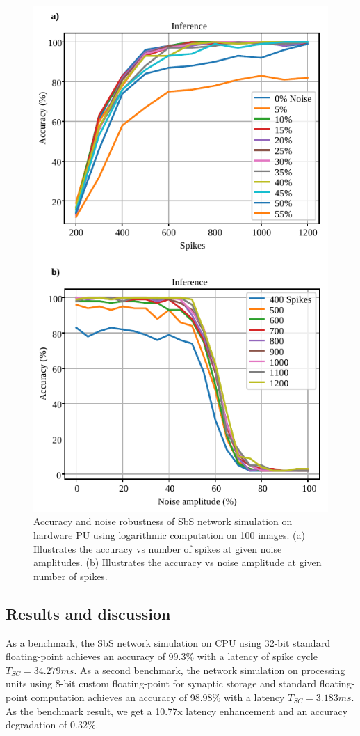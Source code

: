 \begin{figure}[h!]
	\centering
	\includegraphics[width=1\columnwidth]{../figures/accuracy_vs_noise_pu_log.pdf}
	\caption{Accuracy and noise robustness of SbS network simulation on hardware PU using logarithmic computation on 100 images. (a) Illustrates the accuracy vs number of spikes at given noise amplitudes. (b) Illustrates the accuracy vs noise amplitude at given number of spikes.}
	\label{fig:accuracy_vs_noise_pu_log}
\end{figure}


\subsection{Results and discussion}
As a benchmark, the SbS network simulation on CPU using 32-bit standard floating-point achieves an accuracy of 99.3\% with a latency of spike cycle $T_{SC} = 34.279ms$. As a second benchmark, the network simulation on processing units using 8-bit custom floating-point for synaptic storage and standard floating-point computation achieves an accuracy of 98.98\% with a latency $T_{SC}=3.183ms$. As the benchmark result, we get a 10.77x latency enhancement and an accuracy degradation of 0.32\%.

